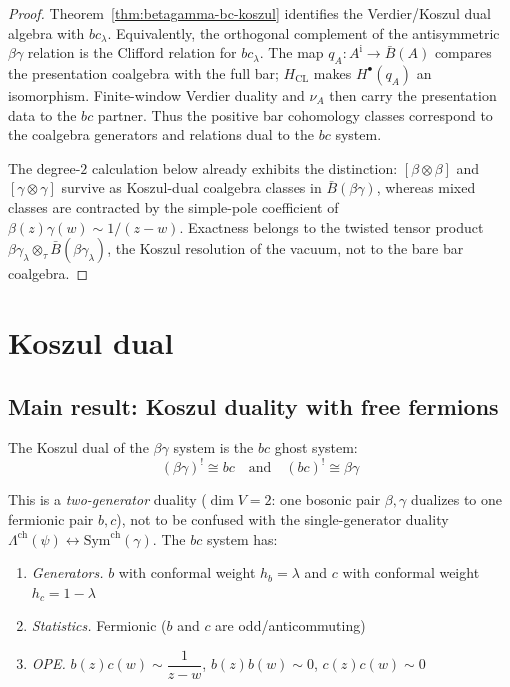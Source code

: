 \begin{proof}
Theorem~\ref{thm:betagamma-bc-koszul} identifies the Verdier/Koszul
dual algebra with $bc_\lambda$. Equivalently, the orthogonal
complement of the antisymmetric $\beta\gamma$ relation is the
Clifford relation for $bc_\lambda$.  The map
$q_A\colon A^{\mathrm i}\to\bar B(A)$ compares the presentation
coalgebra with the full bar; $H_{\mathrm{CL}}$ makes
$H^\bullet(q_A)$ an isomorphism.  Finite-window Verdier duality and
$\nu_A$ then carry the presentation data to the $bc$ partner.  Thus
the positive bar cohomology classes correspond to the coalgebra
generators and relations dual to the $bc$ system.

The degree-$2$ calculation below already exhibits the distinction:
$[\beta\otimes\beta]$ and $[\gamma\otimes\gamma]$ survive as
Koszul-dual coalgebra classes in $\bar B(\beta\gamma)$, whereas mixed
classes are contracted by the simple-pole coefficient of
$\beta(z)\gamma(w)\sim 1/(z-w)$. Exactness belongs to the twisted
tensor product
$\beta\gamma_\lambda\otimes_\tau\bar B(\beta\gamma_\lambda)$, the
Koszul resolution of the vacuum, not to the bare bar coalgebra.
\end{proof}

\section{Koszul dual}
\label{sec:betagamma-koszul-dual}

\subsection{Main result: Koszul duality with free fermions}

\begin{theorem}
\label{thm:betagamma-fermion-koszul}
The Koszul dual of the $\beta\gamma$ system is the $bc$ ghost system:
\[(\beta\gamma)^! \cong bc \quad \text{and} \quad (bc)^! \cong \beta\gamma\]

This is a \emph{two-generator} duality ($\dim V = 2$: one bosonic pair
$\beta, \gamma$ dualizes to one fermionic pair $b, c$), not to be confused with
the single-generator duality $\Lambda^{\mathrm{ch}}(\psi) \leftrightarrow
\mathrm{Sym}^{\mathrm{ch}}(\gamma)$. The $bc$ system has:
\begin{enumerate}
\item \emph{Generators.} $b$ with conformal weight $h_b = \lambda$ and $c$ with conformal weight $h_c = 1 - \lambda$
\item \emph{Statistics.} Fermionic ($b$ and $c$ are odd/anticommuting)
\item \emph{OPE.} $b(z)c(w) \sim \dfrac{1}{z-w}$, \quad $b(z)b(w) \sim 0$, \quad $c(z)c(w) \sim 0$
\end{enumerate}
\end{theorem}

